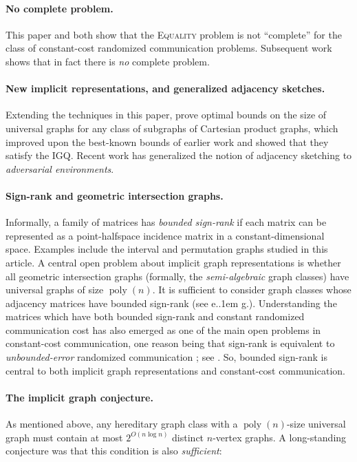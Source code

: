\documentclass{article}
\makeatletter
\DeclareMathOperator{\poly}{poly}
\newcommand*\eg{e.\kern.1em g.\@\xspace} %
\newcommand*\EQUALITY{\textsc{Equality}\xspace}
\makeatother
\begin{document}
\paragraph*{No complete problem.} This paper and \cite{HHH23dimfree} both show that the \EQUALITY
problem is not ``complete'' for the class of constant-cost randomized communication problems.
Subsequent work \cite{FHHH24} shows that in fact there is \emph{no} complete problem.

\paragraph*{New implicit representations, and generalized adjacency sketches.} Extending the
techniques in this paper, \cite{EHZ23} prove optimal bounds on the size of universal graphs for any
class of subgraphs of Cartesian product graphs, which improved upon the best-known bounds of earlier
work \cite{CLR20} and showed that they satisfy the IGQ. Recent work \cite{NP24} has generalized the
notion of adjacency sketching to \emph{adversarial environments}.

\paragraph*{Sign-rank and geometric intersection graphs.}
Informally, a family of matrices has \emph{bounded sign-rank} if each matrix can be represented as a
point-halfspace incidence matrix in a constant-dimensional space. Examples include the interval and
permutation graphs studied in this article. A central open problem about implicit graph
representations is whether all geometric intersection graphs (formally, the \emph{semi-algebraic}
graph classes) have universal graphs of size $\poly(n)$. It is sufficient to consider graph classes
whose adjacency matrices have bounded sign-rank (see \eg \cite{Spin03,Fit19,HZ23}). Understanding
the matrices which have both bounded sign-rank and constant randomized communication cost has also
emerged as one of the main open problems in constant-cost communication, one reason being that
sign-rank is equivalent to \emph{unbounded-error} randomized communication \cite{PS86}; see
\cite{HHPTZ22,ACHS23,CHHS23,HHM23,HZ23}. So, bounded sign-rank is central to both implicit graph
representations and constant-cost communication.


\paragraph*{The implicit graph conjecture.}
As mentioned above, any hereditary graph class with a $\poly(n)$-size universal graph must
contain at most $2^{O(n \log n)}$ distinct $n$-vertex graphs. A long-standing
conjecture was that this condition is also \emph{sufficient}:\\
\end{document}
